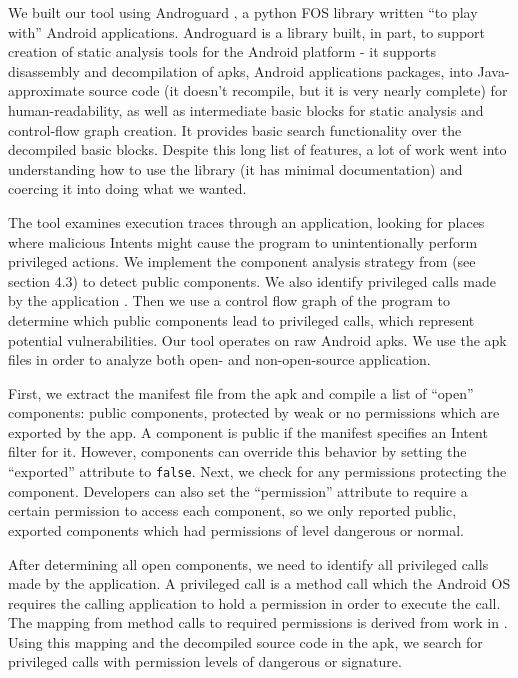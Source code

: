 \documentclass[12pt,a4paper]{article}
\begin{document}
We built our tool using Androguard \cite{androguard}, a python FOS library
written ``to play with'' Android applications. Androguard is a library built, in
part, to support creation of static analysis tools for the Android platform - it
supports disassembly and decompilation of apks, Android applications packages,
into Java-approximate source code (it doesn't recompile, but it is very nearly
complete) for human-readability, as well as intermediate basic blocks for static
analysis and control-flow graph creation. It provides basic search functionality
over the decompiled basic blocks. Despite this long list of features, a lot of
work went into understanding how to use the library (it has minimal
documentation) and coercing it into doing what we wanted.

The tool examines execution traces through an application, looking for places
where malicious Intents might cause the program to unintentionally perform
privileged actions. We implement the component analysis strategy from
\cite{chin_analyzing_2011} (see section 4.3) to detect public components. We
also identify privileged calls made by the application
\cite{felt_android_2011}. Then we use a control flow graph of the program to
determine which public components lead to privileged calls, which represent
potential vulnerabilities. Our tool operates on raw Android apks. We use the apk
files in order to analyze both open- and non-open-source application.

First, we extract the manifest file from the apk and compile a list of ``open''
components: public components, protected by weak or no permissions which are
exported by the app. A component is public if the manifest specifies an Intent
filter for it. However, components can override this behavior by setting the
``exported'' attribute to \texttt{false}. Next, we check for any permissions
protecting the component. Developers can also set the ``permission'' attribute
to require a certain permission to access each component, so we only reported
public, exported components which had permissions of level dangerous or normal.

After determining all open components, we need to identify all privileged calls
made by the application. A privileged call is a method call which the Android OS
requires the calling application to hold a permission in order to execute
the call. The mapping from method calls to required permissions is
derived from work in \cite{felt_android_2011}. Using this mapping and the
decompiled source code in the apk, we search for privileged calls with
permission levels of dangerous or signature.
\end{document}
